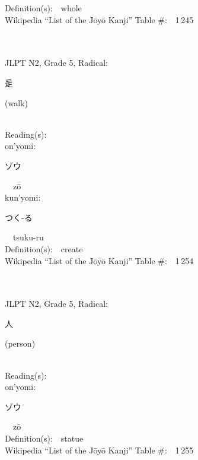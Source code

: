 \begin{multicols}{2}
Definition(s):\ \ whole \\
Wikipedia ``List of the J\=oy\=o Kanji'' Table \#:\ \ 1\,245 \\
\ \ \\
{\fontsize{34pt}{40pt}  }\ \ \\  %
{JLPT N2, Grade 5, Radical:\ \ {\begin{CJK}{UTF8}{min} 辵 \end{CJK}} (walk) } \\
Reading(s):\ \ \\
{\hspace*{1em}}on'yomi:\ \ \\
{\hspace*{2em}}{\begin{CJK}{UTF8}{min} ゾウ \end{CJK}}\ \ z\=o\ \ \\
{\hspace*{1em}}kun'yomi:\ \ \\
{\hspace*{2em}}{\begin{CJK}{UTF8}{min} つく-る \end{CJK}}\ \ tsuku-ru\ \ \\
Definition(s):\ \ create \\
Wikipedia ``List of the J\=oy\=o Kanji'' Table \#:\ \ 1\,254 \\
\ \ \\
{\fontsize{34pt}{40pt}  }\ \ \\  %
{JLPT N2, Grade 5, Radical:\ \ {\begin{CJK}{UTF8}{min} 人 \end{CJK}} (person) } \\
Reading(s):\ \ \\
{\hspace*{1em}}on'yomi:\ \ \\
{\hspace*{2em}}{\begin{CJK}{UTF8}{min} ゾウ \end{CJK}}\ \ z\=o\ \ \\
Definition(s):\ \ statue \\
Wikipedia ``List of the J\=oy\=o Kanji'' Table \#:\ \ 1\,255 \\

\end{multicols}
